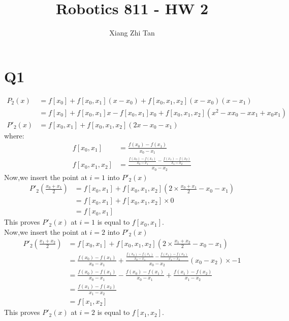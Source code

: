 \documentclass{article}
\begin{document}
\title{Robotics 811 - HW 2}
\author{Xiang Zhi Tan}

\maketitle

\section{Q1}
\begin{equation*}
\begin{aligned}
P_2(x) &= f[x_0] + f[x_0, x_1](x - x_0) + f[x_0, x_1,x_2](x-x_0)(x-x_1)\\
&= f[x_0] + f[x_0, x_1]x - f[x_0, x_1]x_0 + f[x_0, x_1,x_2](x^{2} - xx_0 - xx_1 + x_0x_1)\\
P'_2(x) &= f[x_0, x_1] + f[x_0, x_1,x_2](2x - x_0 - x_1)
\end{aligned}
\end{equation*}
where:
\begin{equation*}
\begin{aligned}
f[x_0, x_1] &= \frac{f(x_0) - f(x_1)}{x_0 - x_1} \\
f[x_0, x_1,x_2] & = \frac{\frac{f(x_0) - f(x_1)}{x_0 - x_1} - \frac{f(x_1) - f(x_2)}{x_1 - x_2}}{x_0 - x_2}
\end{aligned}
\end{equation*}
Now,we insert the point at $i = 1$ into $P'_2(x)$
\begin{equation*}
\begin{aligned}
P'_2(\frac{x_0+x_1}{2}) &= f[x_0,x_1] +  f[x_0, x_1,x_2](2 \times \frac{x_0+x_1}{2} - x_0 - x_1)\\
& = f[x_0,x_1] +  f[x_0, x_1,x_2] \times 0\\
& = f[x_0,x_1]
\end{aligned}
\end{equation*}
This proves $P'_2(x)$ at $i = 1$ is equal to $f[x_0,x_1]$.\\
Now,we insert the point at $i = 2$ into $P'_2(x)$
\begin{equation*}
\begin{aligned}
P'_2(\frac{x_1+x_2}{2}) &= f[x_0,x_1] +  f[x_0, x_1,x_2](2 \times \frac{x_1+x_2}{2} - x_0 - x_1)\\
& = \frac{f(x_0) - f(x_1)}{x_0 - x_1} + \frac{\frac{f(x_0) - f(x_1)}{x_0 - x_1} - \frac{f(x_1) - f(x_2)}{x_1 - x_2}}{x_0 - x_2} (x_0 - x_2) \times -1\\
& = \frac{f(x_0) - f(x_1)}{x_0 - x_1} - \frac{f(x_0) - f(x_1)}{x_0 - x_1} + \frac{f(x_1) - f(x_2)}{x_1 - x_2} \\
& = \frac{f(x_1) - f(x_2)}{x_1 - x_2} \\
& = f[x_1,x_2]
\end{aligned}
\end{equation*}
This proves $P'_2(x)$ at $i = 2$ is equal to $f[x_1,x_2]$.\\
\end{document}
